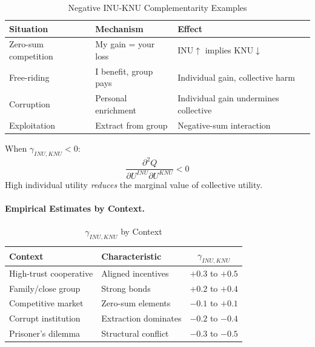 \begin{table}[htbp]
\centering
\caption{Negative INU-KNU Complementarity Examples}
\label{tab:app-c-inu-knu-negative}
\renewcommand{\arraystretch}{1.3}
\begin{tabular}{@{}lll@{}}
\toprule
\textbf{Situation} & \textbf{Mechanism} & \textbf{Effect} \\
\midrule
Zero-sum competition & My gain = your loss & INU$\uparrow$ implies KNU$\downarrow$ \\
Free-riding & I benefit, group pays & Individual gain, collective harm \\
Corruption & Personal enrichment & Individual gain undermines collective \\
Exploitation & Extract from group & Negative-sum interaction \\
\bottomrule
\end{tabular}
\end{table}

When $\gamma_{INU,KNU} < 0$:
\begin{equation}
\frac{\partial^2 Q}{\partial U^{INU} \partial U^{KNU}} < 0
\end{equation}
High individual utility \emph{reduces} the marginal value of collective utility.

\paragraph{Empirical Estimates by Context.}

\begin{table}[htbp]
\centering
\caption{$\gamma_{INU,KNU}$ by Context}
\label{tab:app-c-gamma-inu-knu-context}
\renewcommand{\arraystretch}{1.3}
\begin{tabular}{@{}llc@{}}
\toprule
\textbf{Context} & \textbf{Characteristic} & $\gamma_{INU,KNU}$ \\
\midrule
High-trust cooperative & Aligned incentives & $+0.3$ to $+0.5$ \\
Family/close group & Strong bonds & $+0.2$ to $+0.4$ \\
Competitive market & Zero-sum elements & $-0.1$ to $+0.1$ \\
Corrupt institution & Extraction dominates & $-0.2$ to $-0.4$ \\
Prisoner's dilemma & Structural conflict & $-0.3$ to $-0.5$ \\
\bottomrule
\end{tabular}
\end{table}

